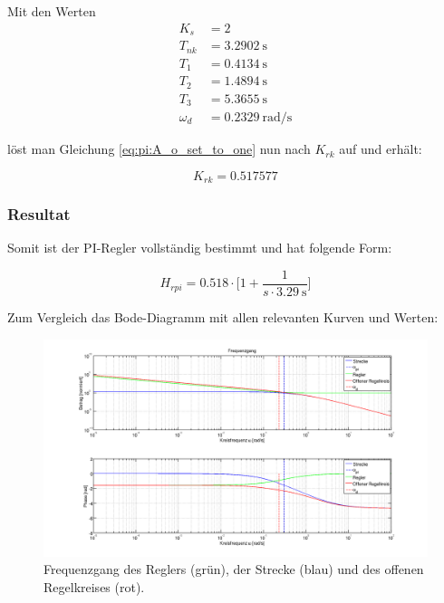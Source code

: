 Mit den Werten
\begin{equation} \label{eq:pi:values}
    \begin{split}
        K_s      & = 2                    \\
        T_{nk}   & = \SI{3.2902}{\second} \\
        T_1      & = \SI{0.4134}{\second} \\
        T_2      & = \SI{1.4894}{\second} \\
        T_3      & = \SI{5.3655}{\second} \\
        \omega_d & = \SI{0.2329}{\radian\per\second}
    \end{split}
\end{equation}

l\"ost  man Gleichung  \ref{eq:pi:A_o_set_to_one}  nun nach  $K_{rk}$ auf  und
erh\"alt:

\begin{equation} \label{eq:pi:k_rk_result}
    K_{rk} = 0.517577
\end{equation}


\clearpage
\subsubsection{Resultat}

Somit ist der PI-Regler vollst\"andig bestimmt und hat folgende Form:

\begin{equation} \label{eq:pi:result}
    H_{rpi} = 0.518 \cdot \biggl[ 1 + \frac{1}{s \cdot \SI{3.29}{\second}} \biggr]
\end{equation}

Zum Vergleich das Bode-Diagramm mit allen relevanten Kurven und Werten:
\begin{figure}[h! width=\pagewidth]
    \includegraphics[width=\textwidth]{images/piBode.png}
    \caption{%
        Frequenzgang des Reglers (gr\"un), der  Strecke (blau) und des offenen
        Regelkreises (rot).
    }
    \label{fig:pi:all}
\end{figure}

